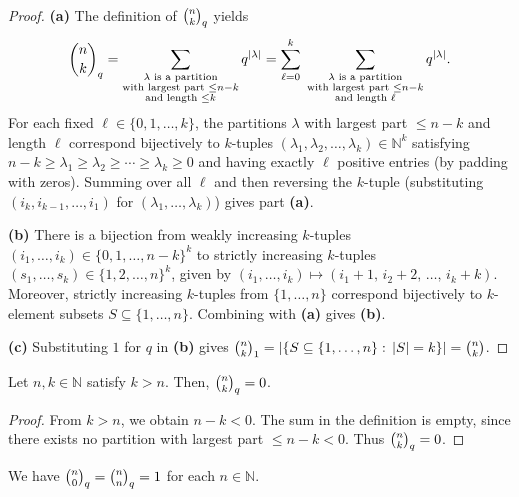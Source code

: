\begin{proof}
\textbf{(a)} The definition of $\dbinom{n}{k}_{q}$ yields
\[
\dbinom{n}{k}_{q}
=\sum_{\substack{\lambda\text{ is a partition}\\\text{with largest part }\leq
n-k\\\text{and length }\leq k}}q^{|\lambda|}
=\sum_{\ell=0}^{k}\;\sum_{\substack{\lambda\text{ is a partition}
\\\text{with largest part }\leq n-k\\\text{and length }\ell}}q^{|\lambda|}.
\]
For each fixed $\ell\in\{0,1,\ldots,k\}$, the partitions $\lambda$ with
largest part $\leq n-k$ and length $\ell$ correspond bijectively to
$k$-tuples $(\lambda_{1},\lambda_{2},\ldots,\lambda_{k})\in\mathbb{N}^{k}$
satisfying $n-k\geq\lambda_{1}\geq\lambda_{2}\geq\cdots\geq\lambda_{k}\geq0$
and having exactly $\ell$ positive entries (by padding with zeros).
Summing over all $\ell$ and then reversing the $k$-tuple (substituting
$(i_{k},i_{k-1},\ldots,i_{1})$ for $(\lambda_{1},\ldots,\lambda_{k})$)
gives part \textbf{(a)}.

\textbf{(b)} There is a bijection from weakly increasing $k$-tuples
$(i_{1},\ldots,i_{k})\in\{0,1,\ldots,n-k\}^{k}$ to strictly increasing
$k$-tuples $(s_{1},\ldots,s_{k})\in\{1,2,\ldots,n\}^{k}$, given by
$(i_{1},\ldots,i_{k})\mapsto(i_{1}+1,\,i_{2}+2,\,\ldots,\,i_{k}+k)$.
Moreover, strictly increasing $k$-tuples from $\{1,\ldots,n\}$ correspond
bijectively to $k$-element subsets $S\subseteq\{1,\ldots,n\}$.
Combining with \textbf{(a)} gives \textbf{(b)}.

\textbf{(c)} Substituting $1$ for $q$ in \textbf{(b)} gives
$\dbinom{n}{k}_{1} = |\{S\subseteq\{1,\ldots,n\}:\,|S|=k\}| = \dbinom{n}{k}$.
\end{proof}

\begin{proposition}
\label{prop.pars.qbinom.0}
\leantarget
\leanok
Let $n,k\in\mathbb{N}$ satisfy $k>n$. Then,
$\dbinom{n}{k}_{q}=0$.
\end{proposition}

\begin{proof}
\leanok
From $k>n$, we obtain $n-k<0$. The sum in the definition is empty,
since there exists no partition with largest part $\leq n-k < 0$.
Thus $\dbinom{n}{k}_{q} = 0$.
\end{proof}

\begin{proposition}
\label{prop.pars.qbinom.n0}
\leantarget
\leanok
We have $\dbinom{n}{0}_{q}=\dbinom{n}{n}_{q}=1$ for
each $n\in\mathbb{N}$.
\end{proposition}

